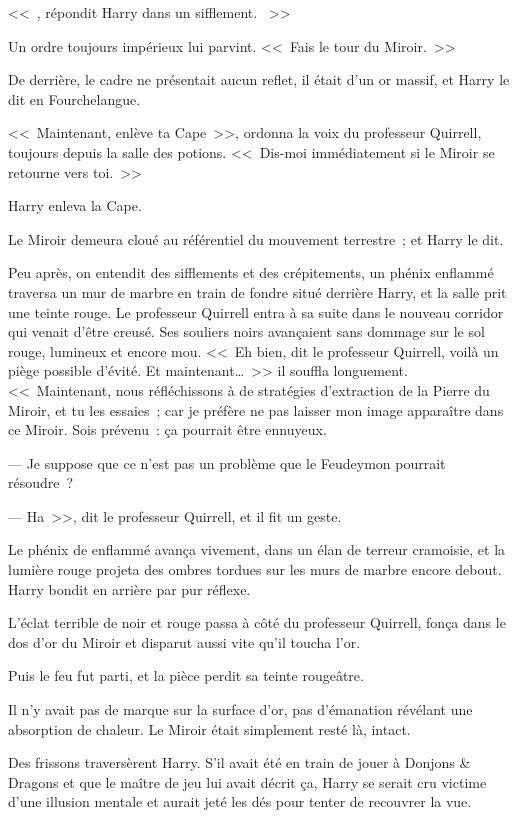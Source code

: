 <<~, répondit Harry dans un sifflement. ~>>

Un ordre toujours impérieux lui parvint. <<~Fais le tour du Miroir.~>>

De derrière, le cadre ne présentait aucun reflet, il était d'un or massif, et Harry le dit en Fourchelangue.

<<~Maintenant, enlève ta Cape~>>, ordonna la voix du professeur Quirrell, toujours depuis la salle des potions. <<~Dis-moi immédiatement si le Miroir se retourne vers toi.~>>

Harry enleva la Cape.

Le Miroir demeura cloué au référentiel du mouvement terrestre~; et Harry le dit.

Peu après, on entendit des sifflements et des crépitements, un phénix enflammé traversa un mur de marbre en train de fondre situé derrière Harry, et la salle prit une teinte rouge. Le professeur Quirrell entra à sa suite dans le nouveau corridor qui venait d'être creusé. Ses souliers noirs avançaient sans dommage sur le sol rouge, lumineux et encore mou. <<~Eh bien, dit le professeur Quirrell, voilà un piège possible d'évité. Et maintenant…~>> il souffla longuement. <<~Maintenant, nous réfléchissons à de stratégies d'extraction de la Pierre du Miroir, et tu les essaies~; car je préfère ne pas laisser mon image apparaître dans ce Miroir. Sois prévenu~: ça pourrait être ennuyeux.

--- Je suppose que ce n'est pas un problème que le Feudeymon pourrait résoudre~?

--- Ha~>>, dit le professeur Quirrell, et il fit un geste.

Le phénix de enflammé avança vivement, dans un élan de terreur cramoisie, et la lumière rouge projeta des ombres tordues sur les murs de marbre encore debout. Harry bondit en arrière par pur réflexe.

L'éclat terrible de noir et rouge passa à côté du professeur Quirrell, fonça dans le dos d'or du Miroir et disparut aussi vite qu'il toucha l'or.

Puis le feu fut parti, et la pièce perdit sa teinte rougeâtre.

Il n'y avait pas de marque sur la surface d'or, pas d'émanation révélant une absorption de chaleur. Le Miroir était simplement resté là, intact.

Des frissons traversèrent Harry. S'il avait été en train de jouer à Donjons \& Dragons et que le maître de jeu lui avait décrit ça, Harry se serait cru victime d'une illusion mentale et aurait jeté les dés pour tenter de recouvrer la vue.

